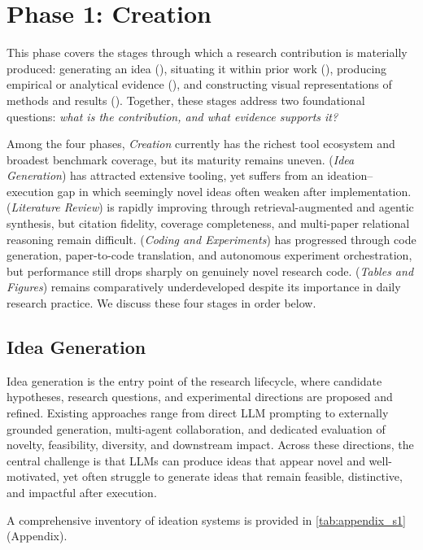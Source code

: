 \section{Phase 1: Creation}
\label{sec:creation}

This phase covers the stages through which a research contribution is materially produced: generating an idea (\Sone), situating it within prior work (\Stwo), producing empirical or analytical evidence (\Sthree), and constructing visual representations of methods and results (\Sfour). Together, these stages address two foundational questions: \emph{what is the contribution, and what evidence supports it?}

Among the four phases, \emph{Creation} currently has the richest tool ecosystem and broadest benchmark coverage, but its maturity remains uneven. \Sone (\emph{Idea Generation}) has attracted extensive tooling, yet suffers from an ideation--execution gap in which seemingly novel ideas often weaken after implementation. \Stwo (\emph{Literature Review}) is rapidly improving through retrieval-augmented and agentic synthesis, but citation fidelity, coverage completeness, and multi-paper relational reasoning remain difficult. \Sthree (\emph{Coding and Experiments}) has progressed through code generation, paper-to-code translation, and autonomous experiment orchestration, but performance still drops sharply on genuinely novel research code. \Sfour (\emph{Tables and Figures}) remains comparatively underdeveloped despite its importance in daily research practice. We discuss these four stages in order below.



\subsection{Idea Generation}
\label{sec:ideation}

Idea generation is the entry point of the research lifecycle, where candidate hypotheses, research questions, and experimental directions are proposed and refined. Existing approaches range from direct LLM prompting to externally grounded generation, multi-agent collaboration, and dedicated evaluation of novelty, feasibility, diversity, and downstream impact. Across these directions, the central challenge is that LLMs can produce ideas that appear novel and well-motivated, yet often struggle to generate ideas that remain feasible, distinctive, and impactful after execution. 

A comprehensive inventory of ideation systems is provided in \cref{tab:appendix_s1} (Appendix).



